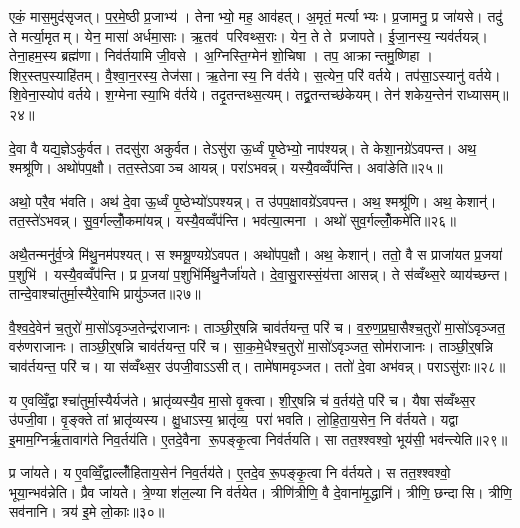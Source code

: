 एकं॒ मास॒मुद॑सृजत्। प॒र॒मे॒ष्ठी प्र॒जाभ्य॑। तेनाभ्यो॒ मह॒ आव॑हत्। अ॒मृतं॒ मर्त्याभ्यः। प्र॒जामनु॒ प्र जा॑यसे। तदु॑ ते मर्त्या॒मृतम्। येन॒ मासा॑ अर्धमा॒साः। ऋ॒तव॑ परिवथ्स॒राः। येन॒ ते ते प्रजापते। ई॒जा॒नस्य॒ न्यव॑र्तयन्न्। तेना॒हम॒स्य ब्रह्म॑णा। निव॑र्तयामि जी॒वसे। अ॒ग्निस्ति॒ग्मेन॑ शो॒चिषा। तप॒ आक्रान्तमु॒ष्णिहा। शिर॒स्तप॒स्याहि॑तम्। वै॒श्वा॒न॒रस्य॒ तेज॑सा। ऋ॒तेनास्य॒ नि व॑र्तये। स॒त्येन॒ परि॑ वर्तये। तप॑सा॒ऽस्यानु॑ वर्तये। शि॒वेना॒स्योप॑ वर्तये। श॒ग्मेनास्या॒भि व॑र्तये। तदृ॒तन्तथ्स॒त्यम्। तद्व्र॒तन्तच्छ॑केयम्। तेन॑ शकेय॒न्तेन॑ राध्यासम्॥२४॥

दे॒वा वै यद्य॒ज्ञेऽकु॑र्वत। तदसु॑रा अकुर्वत। तेऽसु॑रा ऊ॒र्ध्वं पृ॒ष्ठेभ्यो॒ नाप॑श्यन्न्। ते केशा॒नग्रे॑ऽवपन्त। अथ॒ श्मश्रू॑णि। अथो॑पप॒क्षौ। तत॒स्तेऽवाञ्च आयन्न्। परा॑ऽभवन्न्। यस्यै॒वव्वँप॑न्ति। अवा॑ङेति॥२५॥

अथो॒ परै॒व भ॑वति। अथ॑ दे॒वा ऊ॒र्ध्वं पृ॒ष्ठेभ्यो॑ऽपश्यन्न्। त उ॑पप॒क्षावग्रे॑ऽवपन्त। अथ॒ श्मश्रू॑णि। अथ॒ केशान्॑। तत॒स्ते॑ऽभवन्न्। सु॒व॒र्गल्लोँ॒कमा॑यन्न्। यस्यै॒वव्वँप॑न्ति। भव॑त्या॒त्मना। अथो॑ सुव॒र्गल्लोँ॒कमे॑ति॥२६॥

अथै॒तन्मनु॑र्व॒प्त्रे मि॑थु॒नम॑पश्यत्। स श्मश्रू॒ण्यग्रे॑ऽवपत। अथो॑पप॒क्षौ। अथ॒ केशान्॑। ततो॒ वै स प्राजा॑यत प्र॒जया॑ प॒शुभि॑। यस्यै॒वव्वँप॑न्ति। प्र प्र॒जया॑ प॒शुभि॑र्मिथु॒नैर्जा॑यते। दे॒वा॒सु॒रास्सं॒य॑त्ता आसन्न्। ते स॑व्वँथ्स॒रे व्याय॑च्छन्त। तान्दे॒वाश्चा॑तुर्मा॒स्यैरे॒वाभि प्रायु॑ञ्जत॥२७॥

वै॒श्व॒दे॒वेन॑ च॒तुरो॑ मा॒सो॑ऽवृञ्ज॒तेन्द्र॑राजानः। ताञ्छी॒र्॒षन्नि चाव॑र्तयन्त॒ परि॑ च। व॒रु॒ण॒प्र॒घा॒सैश्च॒तुरो॑ मा॒सो॑ऽवृञ्जत॒ वरु॑णराजानः। ताञ्छी॒र्॒षन्नि चाव॑र्तयन्त॒ परि॑ च। सा॒क॒मे॒धैश्च॒तुरो॑ मा॒सो॑ऽवृञ्जत॒ सोम॑राजानः। ताञ्छी॒र्॒षन्नि चाव॑र्तयन्त॒ परि॑ च। या स॑व्वँथ्स॒र उ॑पजी॒वाऽऽसीत्। तामे॑षामवृञ्जत। ततो॑ दे॒वा अभ॑वन्न्। पराऽसु॑राः॥२८॥

य ए॒वव्विँ॒द्वाश्चा॑तुर्मा॒स्यैर्यज॑ते। भ्रातृ॑व्यस्यै॒व मा॒सो वृ॒क्त्वा। शी॒र्॒षन्नि च॑ व॒र्तय॑ते॒ परि॑ च। यैषा स॑व्वँथ्स॒र उ॑पजी॒वा। वृ॒ङ्क्ते तां भ्रातृ॑व्यस्य। क्षु॒धाऽस्य॒ भ्रातृ॑व्य॒ परा॑ भवति। लो॒हि॒ता॒य॒सेन॒ नि व॑र्तयते। यद्वा इ॒माम॒ग्निर्ऋ॒तावाग॑ते निव॒र्तय॑ति। ए॒तदे॒वैना रू॒पङ्कृ॒त्वा निव॑र्तयति। सा तत॒श्श्वश्वो॒ भूय॑सी॒ भव॑न्त्येति॥२९॥

प्र जा॑यते। य ए॒वव्विँ॒द्वाल्लोँ॑हिताय॒सेन॑ निव॒र्तय॑ते। ए॒तदे॒व रू॒पङ्कृ॒त्वा नि व॑र्तयते। स तत॒श्श्वश्वो॒ भूया॒न्भव॑न्नेति। प्रैव जा॑यते। त्रे॒ण्या श॑ल॒ल्या नि व॑र्तयेत। त्रीणि॑त्रीणि॒ वै दे॒वाना॑मृ॒द्धानि॑। त्रीणि॒ छन्दासि। त्रीणि॒ सव॑नानि। त्रय॑ इ॒मे लो॒काः॥३०॥

